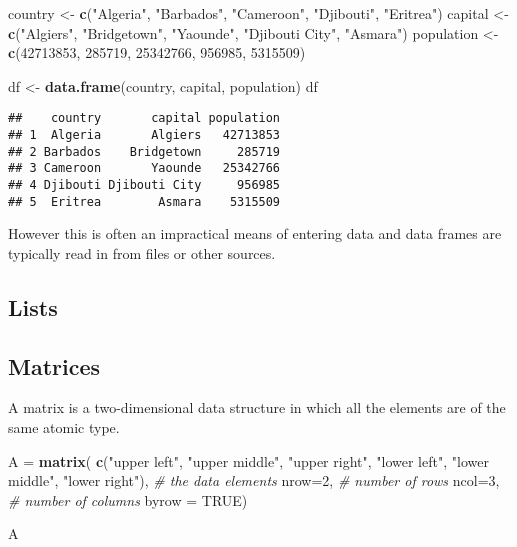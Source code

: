 \documentclass[]{book}
\newenvironment{Shaded}{\begin{snugshade}}{\end{snugshade}}
\newcommand{\CommentTok}[1]{\textcolor[rgb]{0.56,0.35,0.01}{\textit{#1}}}
\newcommand{\DataTypeTok}[1]{\textcolor[rgb]{0.13,0.29,0.53}{#1}}
\newcommand{\DecValTok}[1]{\textcolor[rgb]{0.00,0.00,0.81}{#1}}
\newcommand{\KeywordTok}[1]{\textcolor[rgb]{0.13,0.29,0.53}{\textbf{#1}}}
\newcommand{\NormalTok}[1]{#1}
\newcommand{\OtherTok}[1]{\textcolor[rgb]{0.56,0.35,0.01}{#1}}
\newcommand{\StringTok}[1]{\textcolor[rgb]{0.31,0.60,0.02}{#1}}
\begin{document}
\begin{Shaded}
\begin{Highlighting}[]
\NormalTok{country <-}\StringTok{ }\KeywordTok{c}\NormalTok{(}\StringTok{"Algeria"}\NormalTok{, }\StringTok{"Barbados"}\NormalTok{, }\StringTok{"Cameroon"}\NormalTok{, }\StringTok{"Djibouti"}\NormalTok{, }\StringTok{"Eritrea"}\NormalTok{)}
\NormalTok{capital <-}\StringTok{ }\KeywordTok{c}\NormalTok{(}\StringTok{"Algiers"}\NormalTok{, }\StringTok{"Bridgetown"}\NormalTok{, }\StringTok{"Yaounde"}\NormalTok{, }\StringTok{"Djibouti City"}\NormalTok{, }\StringTok{"Asmara"}\NormalTok{)}
\NormalTok{population <-}\StringTok{ }\KeywordTok{c}\NormalTok{(}\DecValTok{42713853}\NormalTok{, }\DecValTok{285719}\NormalTok{, }\DecValTok{25342766}\NormalTok{, }\DecValTok{956985}\NormalTok{, }\DecValTok{5315509}\NormalTok{)}

\NormalTok{df <-}\StringTok{ }\KeywordTok{data.frame}\NormalTok{(country, capital, population)}
\NormalTok{df}
\end{Highlighting}
\end{Shaded}

\begin{verbatim}
##    country       capital population
## 1  Algeria       Algiers   42713853
## 2 Barbados    Bridgetown     285719
## 3 Cameroon       Yaounde   25342766
## 4 Djibouti Djibouti City     956985
## 5  Eritrea        Asmara    5315509
\end{verbatim}

However this is often an impractical means of entering data and data frames are typically read in from files or other sources.

\hypertarget{lists}{%
\subsection*{Lists}\label{lists}}

\hypertarget{matrices}{%
\subsection*{Matrices}\label{matrices}}

A matrix is a two-dimensional data structure in which all the elements are of the same atomic type.

\begin{Shaded}
\begin{Highlighting}[]
\NormalTok{A =}\StringTok{ }\KeywordTok{matrix}\NormalTok{( }
  \KeywordTok{c}\NormalTok{(}\StringTok{"upper left"}\NormalTok{, }\StringTok{"upper middle"}\NormalTok{, }\StringTok{"upper right"}\NormalTok{, }\StringTok{"lower left"}\NormalTok{, }\StringTok{"lower middle"}\NormalTok{, }\StringTok{"lower right"}\NormalTok{), }\CommentTok{# the data elements }
  \DataTypeTok{nrow=}\DecValTok{2}\NormalTok{,              }\CommentTok{# number of rows }
  \DataTypeTok{ncol=}\DecValTok{3}\NormalTok{,              }\CommentTok{# number of columns }
  \DataTypeTok{byrow =} \OtherTok{TRUE}\NormalTok{)}

\NormalTok{A}
\end{Highlighting}
\end{Shaded}
\end{document}
